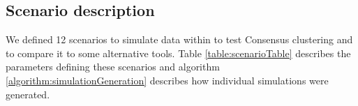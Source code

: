 \documentclass[]{article}
\begin{document}
\subsection{Scenario description}
We defined 12 scenarios to simulate data within to test Consensus clustering and to compare it to some alternative tools. Table \ref{table:scenarioTable} describes the parameters defining these scenarios and algorithm \ref{algorithm:simulationGeneration} describes how individual simulations were generated.
\end{document}
